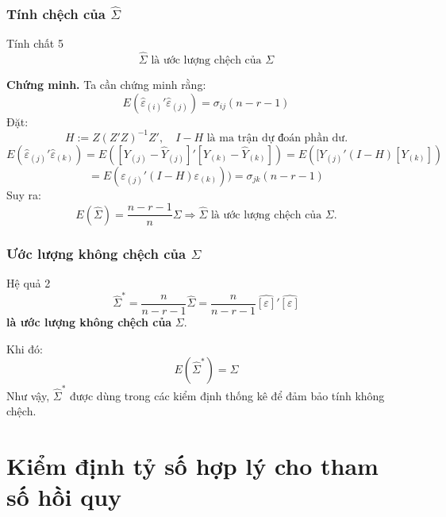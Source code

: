 \begin{frame}
\frametitle{Tính chệch của $\widehat{\Sigma}$}
\begin{block}{Tính chất 5}
\[
\boxed{
\widehat{\Sigma} \text{ là ước lượng chệch của } \Sigma
}
\]
\end{block}
\textbf{Chứng minh.}  
Ta cần chứng minh rằng:
\[
E(\widehat{\varepsilon}_{(i)}'\widehat{\varepsilon}_{(j)}) = \sigma_{ij}(n - r - 1)
\]
Đặt:
\[
H := Z(Z'Z)^{-1}Z', \quad I - H \text{ là ma trận dự đoán phần dư.}
\]
\[
E(\widehat{\varepsilon}_{(j)}'\widehat{\varepsilon}_{(k)}) 
= E([Y_{(j)} - \widehat{Y}_{(j)}]'[Y_{(k)} - \widehat{Y}_{(k)}])
= E([Y_{(j)}'(I-H)[Y_{(k)}])
\]
\[
= E(\varepsilon_{(j)}'(I-H)\varepsilon_{(k)}))
= \sigma_{jk}(n - r - 1)
\]
Suy ra:
\[
E(\widehat{\Sigma}) = \frac{n-r-1}{n}\Sigma
\Rightarrow \widehat{\Sigma} \text{ là ước lượng chệch của } \Sigma.
\]
\end{frame}

\begin{frame}
\frametitle{Ước lượng không chệch của $\Sigma$}
\begin{block}{Hệ quả 2}
\[
\boxed{
\widehat{\Sigma}^* = \frac{n}{n - r - 1}\widehat{\Sigma}
= \frac{n}{n - r - 1}\widehat{[\varepsilon]}'\widehat{[\varepsilon]}
}
\]
\textbf{là ước lượng không chệch của} $\Sigma$.
\end{block}
Khi đó:
\[
E(\widehat{\Sigma}^*) = \Sigma
\]
Như vậy, $\widehat{\Sigma}^*$ được dùng trong các kiểm định thống kê để đảm bảo tính không chệch.
\end{frame}

\section{Kiểm định tỷ số hợp lý cho tham số hồi quy}
